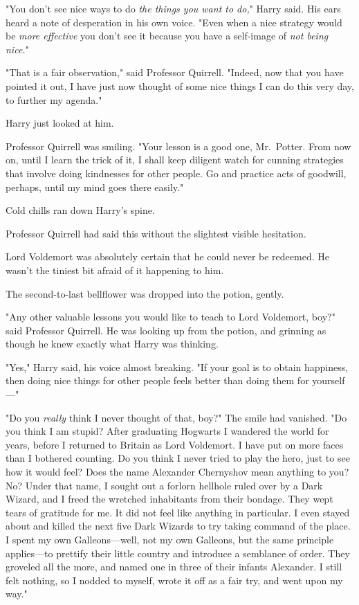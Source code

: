 "You don't see nice ways to do \emph{the things you want to do,}" Harry said.
His ears heard a note of desperation in his own voice. "Even when a nice
strategy would be \emph{more effective} you don't see it because you have a
self-image of \emph{not being nice.}"

"That is a fair observation," said Professor Quirrell. "Indeed, now that you
have pointed it out, I have just now thought of some nice things I can do this
very day, to further my agenda."

Harry just looked at him.

Professor Quirrell was smiling. "Your lesson is a good one, Mr.~Potter. From
now on, until I learn the trick of it, I shall keep diligent watch for cunning
strategies that involve doing kindnesses for other people. Go and practice acts
of goodwill, perhaps, until my mind goes there easily."

Cold chills ran down Harry's spine.

Professor Quirrell had said this without the slightest visible hesitation.

Lord Voldemort was absolutely certain that he could never be redeemed. He
wasn't the tiniest bit afraid of it happening to him.

The second-to-last bellflower was dropped into the potion, gently.

"Any other valuable lessons you would like to teach to Lord Voldemort, boy?"
said Professor Quirrell. He was looking up from the potion, and grinning as
though he knew exactly what Harry was thinking.

"Yes," Harry said, his voice almost breaking. "If your goal is to obtain
happiness, then doing nice things for other people feels better than doing them
for yourself---"

"Do you \emph{really} think I never thought of that, boy?" The smile had
vanished. "Do you think I am stupid? After graduating Hogwarts I wandered the
world for years, before I returned to Britain as Lord Voldemort. I have put on
more faces than I bothered counting. Do you think I never tried to play the
hero, just to see how it would feel? Does the name Alexander Chernyshov mean
anything to you? No? Under that name, I sought out a forlorn hellhole ruled
over by a Dark Wizard, and I freed the wretched inhabitants from their bondage.
They wept tears of gratitude for me. It did not feel like anything in
particular. I even stayed about and killed the next five Dark Wizards to try
taking command of the place. I spent my own Galleons---well, not my own
Galleons, but the same principle applies---to prettify their little country and
introduce a semblance of order. They groveled all the more, and named one in
three of their infants Alexander. I still felt nothing, so I nodded to myself,
wrote it off as a fair try, and went upon my way."

